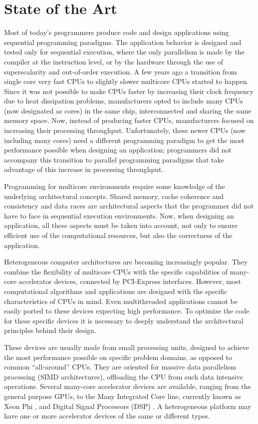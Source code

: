 
\chapter{State of the Art}
\label{stateart}

Most of today’s programmers produce code and design applications using sequential programming paradigms. The application behavior is designed and tested only for sequential execution, where the only parallelism is made by the compiler at the instruction level, or by the hardware through the use of superscalarity and out-of-order execution. A few years ago a transition from single core very fast CPUs to slightly slower multicore CPUs started to happen. Since it was not possible to make CPUs faster by increasing their clock frequency due to heat dissipation problems, manufacturers opted to include many CPUs (now designated as cores) in the same chip, interconnected and sharing the same memory space. Now, instead of producing faster CPUs, manufacturers focused on increasing their processing throughput. Unfortunately, these newer CPUs (now including many cores) need a different programming paradigm to get the most performance possible when designing an application; programmers did not accompany this transition to parallel programming paradigms that take advantage of this increase in processing throughput.

Programming for multicore environments require some knowledge of the underlying architectural concepts. Shared memory, cache coherence and consistency and data races are architectural aspects that the programmer did not have to face in sequential execution environments. Now, when designing an application, all these aspects must be taken into account, not only to ensure efficient use of the computational resources, but also the correctness of the application.

Heterogeneous computer architectures are becoming increasingly popular. They combine the flexibility of multicore CPUs with the specific capabilities of many-core accelerator devices, connected by PCI-Express interfaces. However, most computational algorithms and applications are designed with the specific characteristics of CPUs in mind. Even multithreaded applications cannot be easily ported to these devices expecting high performance. To optimize the code for these specific devices it is necessary to deeply understand the architectural principles behind their design.

These devices are usually made from small processing units, designed to achieve the most performance possible on specific problem domains, as opposed to common ``all-around'' CPUs. They are oriented for massive data parallelism processing (SIMD architectures), offloading the CPU from such data intensive operations. Several many-core accelerator devices are available, ranging from the general purpose GPUs, to the \intel Many Integrated Core line, currently known as \intel Xeon Phi \cite{Intel:MIC}, and Digital Signal Processors (DSP) \cite{Texas:DSP}. A heterogeneous platform may have one or more accelerator devices of the same or different types.

